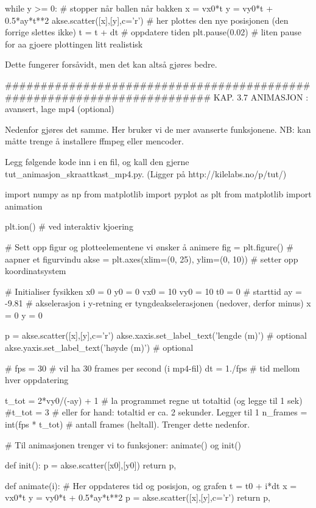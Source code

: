 \documentclass[a4paper,11pt,utf8]{book}
\begin{document}
while y >= 0:  # stopper når ballen når bakken
    x = vx0*t
    y = vy0*t + 0.5*ay*t**2
    akse.scatter([x],[y],c='r')  # her plottes den nye posisjonen (den forrige slettes ikke)
    t = t + dt          # oppdatere tiden
    plt.pause(0.02)     # liten pause for aa gjoere plottingen litt realistisk



Dette fungerer forsåvidt, men det kan altså gjøres bedre.



######################################################################## 
KAP. 3.7  ANIMASJON : avansert, lage mp4 (optional)

Nedenfor gjøres det samme.
Her bruker vi de mer avanserte funksjonene. 
NB: kan måtte trenge å installere ffmpeg eller mencoder. 

Legg følgende kode inn i en fil, og kall den gjerne tut_animasjon_skraattkast_mp4.py. 
(Ligger på http://kilelabs.no/p/tut/)


import numpy as np
from matplotlib import pyplot as plt
from matplotlib import animation

plt.ion()   # ved interaktiv kjoering 

# Sett opp figur og plotteelementene vi ønsker å animere
fig = plt.figure()                           # aapner et figurvindu
akse = plt.axes(xlim=(0, 25), ylim=(0, 10))  # setter opp koordinatsystem

# Initialiser fysikken
x0  = 0
y0  = 0
vx0 = 10
vy0 = 10
t0  = 0      # starttid
ay  = -9.81  # akselerasjon i y-retning er tyngdeakselerasjonen (nedover, derfor minus)
x   = 0
y   = 0

p = akse.scatter([x],[y],c='r')
akse.xaxis.set_label_text('lengde (m)')  # optional
akse.yaxis.set_label_text('høyde (m)')   # optional

# 
fps = 30      # vil ha 30 frames per second (i mp4-fil)
dt = 1./fps   # tid mellom hver oppdatering 

t_tot = 2*vy0/(-ay) + 1      # la programmet regne ut totaltid (og legge til 1 sek)
#t_tot = 3                   # eller for hand: totaltid er ca. 2 sekunder. Legger til 1
n_frames = int(fps * t_tot)  # antall frames (heltall). Trenger dette nedenfor. 



# Til animasjonen trenger vi to funksjoner: animate() og init() 

def init():
    p = akse.scatter([x0],[y0])
    return p,


def animate(i):
    # Her oppdateres tid og posisjon, og grafen
    t = t0 + i*dt
    x = vx0*t
    y = vy0*t + 0.5*ay*t**2
    p = akse.scatter([x],[y],c='r')
    return p,
    
\end{document}
